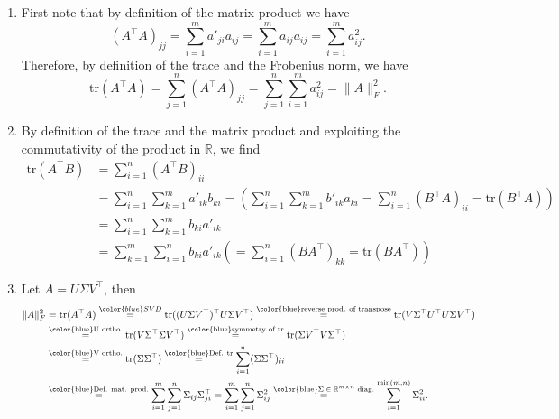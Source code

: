{\color{solution}
	\begin{enumerate}
		\item First note that by definition of the matrix product we have
		$$(A^\top A)_{jj} = \sum_{i=1}^m a'_{ji} a_{ij} = \sum_{i=1}^m a_{ij}a_{ij}  = \sum_{i=1}^m a_{ij}^2.$$
		Therefore, by definition of the trace and the Frobenius norm, we have
		$$
		\text{tr}(A^\top A) = \sum_{j=1}^n (A^\top A)_{jj} =  \sum_{j=1}^n\sum_{i=1}^m a_{ij}^2 = \|A\|_F^2.
		$$
		\item By definition of the trace and the matrix product and exploiting the commutativity of the product in $\mathbb{R}$, we find
		\begin{align*}
		\text{tr}(A^\top B)&=\sum_{i=1}^{n}(A^\top B)_{ii}\\
		&=\sum_{i=1}^{n}\sum_{k=1}^{m}a'_{ik}b_{ki} =\left( \sum_{i=1}^{n}\sum_{k=1}^{m}b'_{ik}a_{ki}	=\sum_{i=1}^{n}(B^\top A)_{ii}=\text{tr}(B^\top A)\right)\\
	&=\sum_{i=1}^{n}\sum_{k=1}^{m}b_{ki}a'_{ik}\\
		&=\sum_{k=1}^{m}\sum_{i=1}^{n}b_{ki}a'_{ik}
		\left(=\sum_{i=1}^{n}(BA^\top)_{kk}=\text{tr}(BA^\top)\right)
		\end{align*}
		\item Let $A = U\Sigma V^\top$, then 
		\begin{align*}
		 \|A\|_F^2 &= \text{tr}(A^\top A) \stackrel{{\color{blue}SVD}}{=}  \text{tr}((U\Sigma V^\top)^\top U\Sigma V^\top)
		 \stackrel{\text{\color{blue}reverse prod. of transpose}}{=}\text{tr}(V \Sigma^\top U^\top U\Sigma V^\top)\\
		& 	 \stackrel{ \text{\color{blue}U ortho.}}{=}\text{tr}(V \Sigma^\top \Sigma V^\top) \stackrel{\text{\color{blue}symmetry of tr}}{=}\text{tr}(\Sigma V^\top V \Sigma^\top )\\
		& \stackrel{ \text{\color{blue}V ortho.}}{=} \text{tr}(\Sigma\Sigma^\top ) \stackrel{ \text{\color{blue}Def. tr}}{=} \sum_{i=1}^n (\Sigma\Sigma^\top )_{ii}\\
		&\stackrel{  \text{\color{blue}Def. mat. prod.}}{=}   \sum_{i=1}^m \sum_{j=1}^n \Sigma_{ij}\Sigma^\top_{ji}=   \sum_{i=1}^m \sum_{j=1}^n \Sigma_{ij}^2 \stackrel{  \text{\color{blue}$\Sigma\in \mathbb{R}^{m \times n}$ diag.}}{=}    \sum_{i=1}^{\min(m,n)}   \Sigma_{ii}^2 .
		\end{align*}
	\end{enumerate}

}